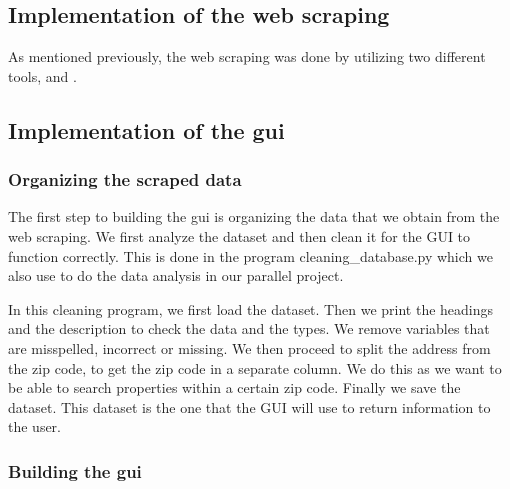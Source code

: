 \documentclass[main]{subfiles}
\begin{document}
\subsection{Implementation of the web scraping}
As mentioned previously, the web scraping was done by utilizing two different tools, \pkg[Scrapy] and \pkg[Selenium].



\subsection{Implementation of the \ac{gui}}

\subsubsection{Organizing the scraped data}
The first step to building the \ac{gui} is organizing the data that we obtain from the web scraping.
We first analyze the dataset and then clean it for the GUI to function correctly.
This is done in the program cleaning\_database.py which we also use to do the data analysis in our parallel project. \par
In this cleaning program, we first load the dataset. 
Then we print the headings and the description to check the data and the types.
We remove variables that are misspelled, incorrect or missing. 
We then proceed to split the address from the zip code, to get the zip code in a separate column. 
We do this as we want to be able to search properties within a certain zip code. 
Finally we save the dataset. This dataset is the one that the GUI will use to return information to the user.

\subsubsection{Building the \ac{gui}}
\end{document}
